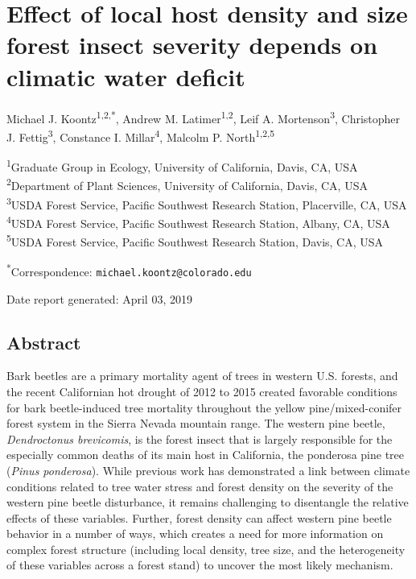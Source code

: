 \documentclass[]{article}
\title{}
\author{}
\date{}
\begin{document}
\section{Effect of local host density and size forest insect severity
depends on climatic water
deficit}\label{effect-of-local-host-density-and-size-forest-insect-severity-depends-on-climatic-water-deficit}

Michael J. Koontz\textsuperscript{1,2,*}, Andrew M.
Latimer\textsuperscript{1,2}, Leif A. Mortenson\textsuperscript{3},
Christopher J. Fettig\textsuperscript{3}, Constance I.
Millar\textsuperscript{4}, Malcolm P. North\textsuperscript{1,2,5}

\textsuperscript{1}Graduate Group in Ecology, University of California,
Davis, CA, USA\\
\textsuperscript{2}Department of Plant Sciences, University of
California, Davis, CA, USA\\
\textsuperscript{3}USDA Forest Service, Pacific Southwest Research
Station, Placerville, CA, USA\\
\textsuperscript{4}USDA Forest Service, Pacific Southwest Research
Station, Albany, CA, USA\\
\textsuperscript{5}USDA Forest Service, Pacific Southwest Research
Station, Davis, CA, USA

\textsuperscript{*}Correspondence: \texttt{michael.koontz@colorado.edu}

Date report generated: April 03, 2019

\subsection{Abstract}\label{abstract}

Bark beetles are a primary mortality agent of trees in western U.S.
forests, and the recent Californian hot drought of 2012 to 2015 created
favorable conditions for bark beetle-induced tree mortality throughout
the yellow pine/mixed-conifer forest system in the Sierra Nevada
mountain range. The western pine beetle, \emph{Dendroctonus brevicomis},
is the forest insect that is largely responsible for the especially
common deaths of its main host in California, the ponderosa pine tree
(\emph{Pinus ponderosa}). While previous work has demonstrated a link
between climate conditions related to tree water stress and forest
density on the severity of the western pine beetle disturbance, it
remains challenging to disentangle the relative effects of these
variables. Further, forest density can affect western pine beetle
behavior in a number of ways, which creates a need for more information
on complex forest structure (including local density, tree size, and the
heterogeneity of these variables across a forest stand) to uncover the
most likely mechanism.
\end{document}
